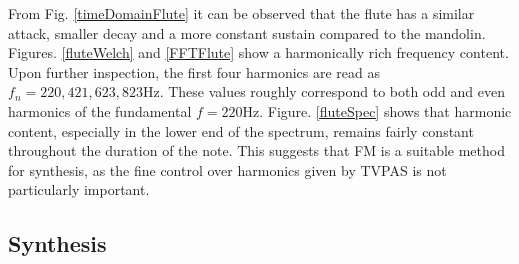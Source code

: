 \documentclass{article}
\begin{document}
            From Fig. \ref{timeDomainFlute} it can be observed that the flute has a similar attack, smaller decay and a more constant sustain compared to the mandolin.
            Figures. \ref{fluteWelch} and \ref{FFTFlute} show a harmonically rich frequency content.
            Upon further inspection, the first four harmonics are read as $f_n = 220, 421, 623, 823\text{Hz}$.
            These values roughly correspond to both odd and even harmonics of the fundamental $f=220\text{Hz}$.
            Figure. \ref{fluteSpec} shows that harmonic content, especially in the lower end of the spectrum, remains fairly constant throughout the duration of the note.
            This suggests that FM is a suitable method for synthesis, as the fine control over harmonics given by TVPAS is not particularly important.
            

    \subsection{Synthesis}
\end{document}
